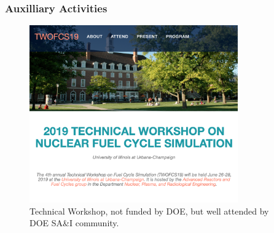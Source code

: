 
\begin{frame}
        \frametitle{Auxilliary Activities}

            \begin{figure}[htbp!]
        \begin{center}
          \includegraphics[width=0.8\textwidth]{images/twofcs.png}
        \end{center}
              \caption{Technical Workshop, not funded by DOE, but well attended 
                    by DOE SA\&I community.}
      \end{figure}
\end{frame}

